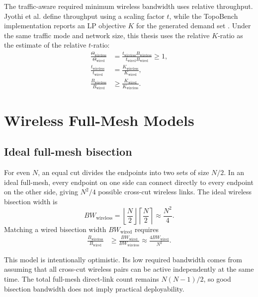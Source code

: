 \documentclass[conference]{IEEEtran}
\begin{document}
The traffic-aware required minimum wireless bandwidth uses relative throughput. Jyothi et al. define throughput using a scaling factor \(t\), while the TopoBench implementation reports an LP objective \(K\) for the generated demand set \cite{jyothi2016}. Under the same traffic mode and network size, this thesis uses the relative \(K\)-ratio as the estimate of the relative \(t\)-ratio:
\begin{align}
\frac{\Theta_{\mathrm{wireless}}}{\Theta_{\mathrm{wired}}}
&=
\frac{t_{\mathrm{wireless}}B_{\mathrm{wireless}}}{t_{\mathrm{wired}}B_{\mathrm{wired}}}
\ge 1, \\
\frac{t_{\mathrm{wireless}}}{t_{\mathrm{wired}}}
&=
\frac{K_{\mathrm{wireless}}}{K_{\mathrm{wired}}}, \\
\frac{B_{\mathrm{wireless}}}{B_{\mathrm{wired}}} &\ge \frac{K_{\mathrm{wired}}}{K_{\mathrm{wireless}}}.
\end{align}

\section{Wireless Full-Mesh Models}

\subsection{Ideal full-mesh bisection}

For even \(N\), an equal cut divides the endpoints into two sets of size \(N/2\). In an ideal full-mesh, every endpoint on one side can connect directly to every endpoint on the other side, giving \(N^2/4\) possible cross-cut wireless links. The ideal wireless bisection width is
\begin{equation}
BW_{\mathrm{wireless}}
=
\left\lfloor\frac{N}{2}\right\rfloor
\left\lceil\frac{N}{2}\right\rceil
\approx
\frac{N^2}{4}.
\end{equation}
Matching a wired bisection width \(BW_{\mathrm{wired}}\) requires
\begin{align}
\frac{B_{\mathrm{wireless}}}{B_{\mathrm{wired}}}
&\ge
\frac{BW_{\mathrm{wired}}}{BW_{\mathrm{wireless}}}
\approx
\frac{4BW_{\mathrm{wired}}}{N^2}.
\end{align}

This model is intentionally optimistic. Its low required bandwidth comes from assuming that all cross-cut wireless pairs can be active independently at the same time. The total full-mesh direct-link count remains \(N(N-1)/2\), so good bisection bandwidth does not imply practical deployability.
\end{document}
